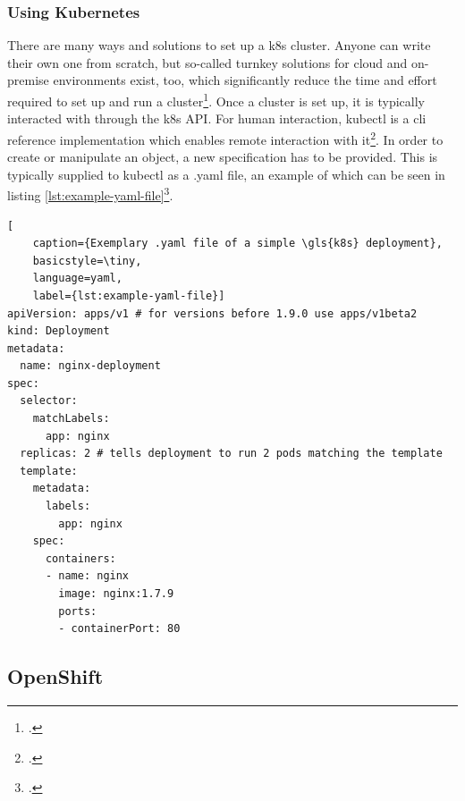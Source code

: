\vspace{-0.5cm}
\subsubsection{Using Kubernetes}
\vspace{-0.5cm}
There are many ways and solutions to set up a \gls{k8s} cluster. Anyone can write their own one from scratch, but so-called turnkey solutions for cloud and on-premise environments exist, too, which significantly reduce the time and effort required to set up and run a cluster\footcite[][, sections 'Turnkey Cloud Solutions' and 'On-Premises turnkey cloud solutions']{turnkey}.
Once a cluster is set up, it is typically interacted with through the \gls{k8s} API. For human interaction, kubectl is a \gls{cli} reference implementation which enables remote interaction with it\footcite[][, section 'The Kubernetes API']{k8sApi}.
In order to create or manipulate an object, a new specification has to be provided. This is typically supplied to kubectl as a .yaml file, an example of which can be seen in listing \ref{lst:example-yaml-file}\footcite[][, section 'Describing a Kubernetes Object']{k8sObjects}.

\begin{lstlisting}[
	caption={Exemplary .yaml file of a simple \gls{k8s} deployment},
	basicstyle=\tiny,
	language=yaml,
	label={lst:example-yaml-file}]
apiVersion: apps/v1 # for versions before 1.9.0 use apps/v1beta2
kind: Deployment
metadata:
  name: nginx-deployment
spec:
  selector:
    matchLabels:
      app: nginx
  replicas: 2 # tells deployment to run 2 pods matching the template
  template:
    metadata:
      labels:
        app: nginx
    spec:
      containers:
      - name: nginx
        image: nginx:1.7.9
        ports:
        - containerPort: 80
\end{lstlisting}

\subsection{OpenShift} \label{openshiftExplanation}

